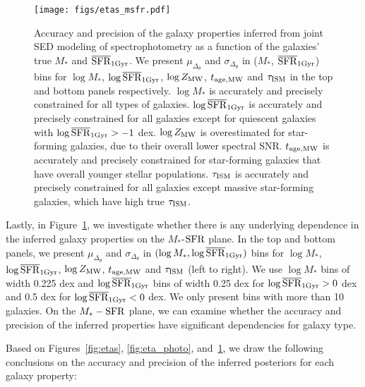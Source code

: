 \begin{figure}
\begin{center}
    \texttt{[image: figs/etas\_msfr.pdf]} 
    \caption{
        Accuracy and precision of the galaxy properties inferred from joint SED
        modeling of spectrophotometry as a function of the galaxies' true $M_*$
        and $\overline{\rm SFR}_{\rm 1Gyr}$. 
        We present $\mu_{\Delta_{\theta}}$ and $\sigma_{\Delta_{\theta}}$ in
        ($M_*$, $\overline{\rm SFR}_{\rm 1Gyr}$) bins for $\log M_*$, $\log\overline{\rm SFR}_{\rm 1Gyr}$, $\log Z_{\rm
        MW}$, $t_{\rm age, MW}$ and $\tau_{\rm ISM}$ in the top and bottom
        panels respectively. 
        $\log M_*$ is accurately and precisely constrained for all types of galaxies. 
        $\log\overline{\rm SFR}_{\rm 1Gyr}$ is accurately and precisely constrained for all galaxies
        except for quiescent galaxies with $\log\overline{\rm SFR}_{\rm 1Gyr} > -1$ dex. 
        $\log Z_{\rm MW}$ is overestimated for star-forming galaxies, due to their
        overall lower spectral SNR. 
        $t_{\rm age, MW}$ is accurately and precisely constrained for star-forming
        galaxies that have overall younger stellar populations. 
        $\tau_{\rm ISM}$ is accurately and precisely constrained for all galaxies
        except massive star-forming galaxies, which have high true $\tau_{\rm ISM}$. 
    }\label{fig:etas_msfr}
\end{center}
\end{figure}

Lastly, in Figure~\ref{fig:etas_msfr}, we investigate whether there is any
underlying dependence in the inferred galaxy properties on the  
$M_*$-${\rm SFR}$ plane. 
In the top and bottom panels, we present $\mu_{\Delta_{\theta}}$ and 
$\sigma_{\Delta_{\theta}}$ in $(\log M_*, \log\overline{\rm SFR}_{\rm 1Gyr})$ bins for 
$\log M_*$, $\log\overline{\rm SFR}_{\rm 1Gyr}$, $\log Z_{\rm MW}$, $t_{\rm age, MW}$ and $\tau_{\rm ISM}$ (left to
right).
We use $\log M_*$ bins of width 0.225 dex and $\log\overline{\rm SFR}_{\rm 1Gyr}$ bins of width 
0.25 dex for $\log \overline{\rm SFR}_{\rm 1Gyr} > 0$ dex and 0.5 dex for $\log \overline{\rm SFR}_{\rm 1Gyr} < 0$ dex. 
We only present bins with more than 10 galaxies. 
On the $M_*-{\rm SFR}$ plane, we can examine whether the accuracy and precision
of the inferred properties have significant dependencies for galaxy type. 

Based on Figures~\ref{fig:etas}, \ref{fig:eta_photo}, and~\ref{fig:etas_msfr},
we draw the following conclusions on the accuracy and precision of the inferred
posteriors for each galaxy property:\\

